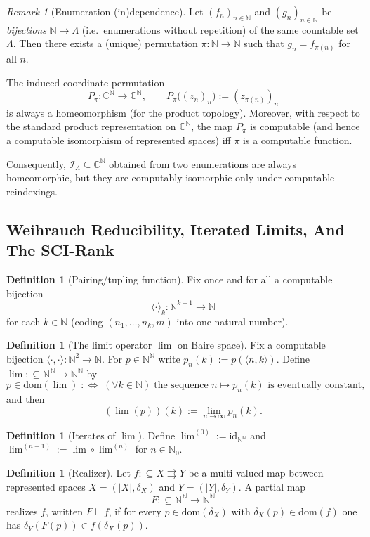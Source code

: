 \documentclass{lmcs} %
\theoremstyle{plain}
\theoremstyle{plain}
\theoremstyle{definition}
\newtheorem{definition}[theorem]{Definition}
\theoremstyle{remark}
\newtheorem{remark}[theorem]{Remark}
\theoremstyle{definition}
\theoremstyle{remark}
\numberwithin{equation}{section}
\newcommand{\N}{\mathbb{N}}
\newcommand{\NN}{\mathbb{N}}
\newcommand{\C}{\mathbb{C}}
\newcommand{\dom}{\mathrm{dom}}
\newcommand{\id}{\mathrm{id}}
\newcommand{\Lim}{\operatorname{lim}}
\newcommand{\Limi}[1]{\Lim^{(#1)}}
\begin{document}
\begin{remark}[Enumeration-(in)dependence]\label{rem:enum-indep}
Let $(f_n)_{n\in\N}$ and $(g_n)_{n\in\N}$ be \textit{bijections}
$\mathbb{N}\to\Lambda$ (i.e.\ enumerations without repetition) of the same countable set $\Lambda$.
Then there exists a (unique) permutation $\pi:\N\to\N$ such that $g_n=f_{\pi(n)}$ for all $n$.

The induced coordinate permutation
\[
P_\pi:\C^\N\to\C^\N,\qquad P_\pi\bigl((z_n)_n\bigr):=(z_{\pi(n)})_n
\]
is always a homeomorphism (for the product topology). Moreover, with respect to the
standard product representation on $\C^\N$, the map $P_\pi$ is computable (and hence
a computable isomorphism of represented spaces) iff $\pi$ is a computable
function.

Consequently, $\mathcal{I}_\Lambda\subseteq\C^\N$ obtained from two enumerations are
always homeomorphic, but they are computably isomorphic only under computable reindexings.
\end{remark}

\subsection{Weihrauch Reducibility, Iterated Limits, And The SCI-Rank}

\begin{definition}[Pairing/tupling function]\label{def:tupling}
Fix once and for all a computable bijection
\[
\langle\cdot\rangle_k:\N^{k+1}\to\N
\]
for each $k\in\N$ (coding $(n_1,\dots,n_k,m)$ into one natural number).
\end{definition}

\begin{definition}[The limit operator $\Lim$ on Baire space]\label{def:lim}
Fix a computable bijection $\langle\cdot,\cdot\rangle:\NN^2\to\NN$.
For $p\in\NN^\NN$ write $p_n(k):=p(\langle n,k\rangle)$.
Define $\Lim:\subseteq\NN^\NN\to\NN^\NN$ by
\[
p\in\dom(\Lim)\;:\Longleftrightarrow\;(\forall k\in\NN)\; \text{the sequence }n\mapsto p_n(k)
\text{ is eventually constant},
\]
and then
\[
(\Lim(p))(k):=\lim_{n\to\infty} p_n(k).
\]
\end{definition}

\begin{definition}[Iterates of $\Lim$]\label{def:lim-iterates}
Define $\Limi{0}:=\id_{\NN^\NN}$ and $\Limi{n+1}:=\Lim\circ\Limi{n}$ for $n\in\NN_0$.
\end{definition}

\begin{definition}[Realizer]
Let $f:\subseteq X \rightrightarrows Y$ be a multi-valued map between represented spaces
$X=(|X|,\delta_X)$ and $Y=(|Y|,\delta_Y)$. A partial map
\[
F:\subseteq \mathbb{N}^{\mathbb{N}} \to \mathbb{N}^{\mathbb{N}}
\]
realizes $f$, written $F \vdash f$, if for every $p \in \dom(\delta_X)$ with
$\delta_X(p)\in\dom(f)$ one has $\delta_Y(F(p)) \in f(\delta_X(p))$.
\end{definition}
\end{document}
